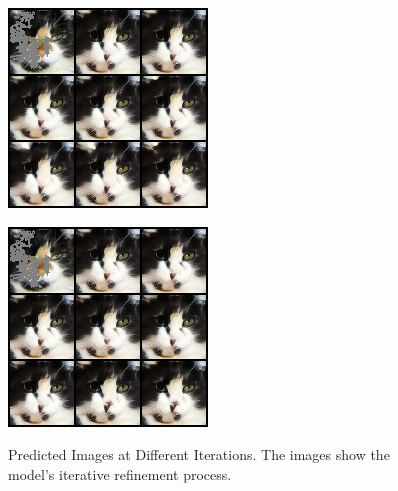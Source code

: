 \begin{figure}[H]
\begin{minipage}[t]{0.3\textwidth}
        \includegraphics[width=\textwidth]{images/linear_pred_test_0.png}
        \label{fig:predicted_linear}
    \end{minipage}
    \hfill
    \begin{minipage}[t]{0.3\textwidth}
        \centering
        \includegraphics[width=\textwidth]{images/sqrt_pred_test_0.png}
        \label{fig:predicted_sqrt}
    \end{minipage}
    \caption{Predicted Images at Different Iterations. The images show the model's iterative refinement process.}
    \label{fig:predicted}
\end{figure}

